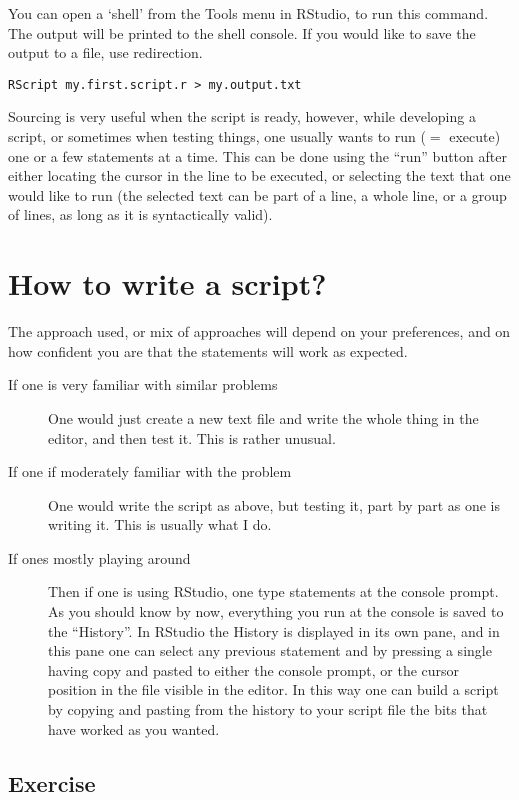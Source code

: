 \documentclass[paper=a4,headsepline,BCOR=12mm,twoside,open=right,%
titlepage,headings=small,fontsize=10pt,index=totoc,bibliography=totoc,%
captions=tableheading,captions=nooneline]{scrbook}\usepackage{knitr}
\begin{document}
You can open a `shell' from the Tools menu in RStudio, to run this command. The output will be printed to the shell console. If you would like to save the output to a file, use redirection.

\begin{verbatim}
RScript my.first.script.r > my.output.txt
\end{verbatim}

Sourcing is very useful when the script is ready, however, while developing a script, or sometimes when testing things, one usually wants to run ($=$ execute) one or a few statements at a time. This can be done using the ``run'' button after either locating the cursor in the line to be executed, or selecting the text that one would like to run (the selected text can be part of a line, a whole line, or a group of lines, as long as it is syntactically valid).

\section{How to write a script?}

The approach used, or mix of approaches will depend on your preferences, and on how confident you are that the statements will work as expected.
\begin{description}
\item[If one is very familiar with similar problems] One would just create a new text file and write the whole thing in the editor, and then test it. This is rather unusual.
\item[If one if moderately familiar with the problem] One would write the script as above, but testing it, part by part as one is writing it. This is usually what I do.
\item[If ones mostly playing around] Then if one is using RStudio, one type statements at the console prompt. As you should know by now, everything you run at the console is saved to the ``History''. In RStudio the History is displayed in its own pane, and in this pane one can select any previous statement and by pressing a single having copy and pasted to either the console prompt, or the cursor position in the file visible in the editor. In this way one can build a script by copying and pasting from the history to your script file the bits that have worked as you wanted.
\end{description}

\subsection{Exercise}
\end{document}
